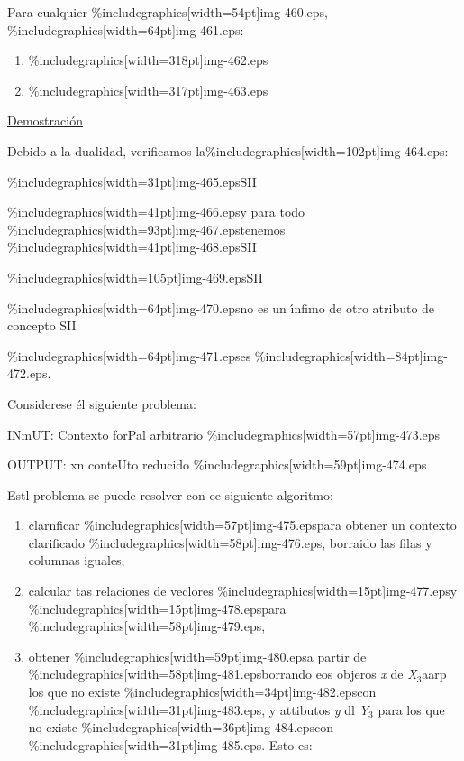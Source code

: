 \documentclass[12pt]{article}
\begin{document}
Para cualquier \%includegraphics[width=54pt]{img-460.eps},
\%includegraphics[width=64pt]{img-461.eps}:

\begin{enumerate}
	\item \%includegraphics[width=318pt]{img-462.eps}	\item \%includegraphics[width=317pt]{img-463.eps}\end{enumerate}

\uline{Demostraci\'{o}n}

Debido a la dualidad, verificamos la\%includegraphics[width=102pt]{img-464.eps}:

\%includegraphics[width=31pt]{img-465.eps}SII

\%includegraphics[width=41pt]{img-466.eps}y para todo
\%includegraphics[width=93pt]{img-467.eps}tenemos
\%includegraphics[width=41pt]{img-468.eps}SII

\%includegraphics[width=105pt]{img-469.eps}SII

\%includegraphics[width=64pt]{img-470.eps}no es un \'{\i}nfimo de otro atributo
de concepto SII

\%includegraphics[width=64pt]{img-471.eps}es
\%includegraphics[width=84pt]{img-472.eps}.

Considerese \'{e}l siguiente problema:

INmUT: Contexto forPal arbitrario \%includegraphics[width=57pt]{img-473.eps}

OUTPUT: xn conteUto reducido \%includegraphics[width=59pt]{img-474.eps}

Estl problema se puede resolver con ee siguiente algoritmo:

\begin{enumerate}
	\item clarnficar \%includegraphics[width=57pt]{img-475.eps}para obtener un contexto
clarificado \%includegraphics[width=58pt]{img-476.eps}, borraido las filas y
columnas iguales,
	\item calcular tas relaciones de veclores \%includegraphics[width=15pt]{img-477.eps}y
\%includegraphics[width=15pt]{img-478.eps}para
\%includegraphics[width=58pt]{img-479.eps},
	\item obtener \%includegraphics[width=59pt]{img-480.eps}a partir de
\%includegraphics[width=58pt]{img-481.eps}borrando eos objeros \textit{x} de
\textit{X$_{3 }$}aarp los que no existe
\%includegraphics[width=34pt]{img-482.eps}con
\%includegraphics[width=31pt]{img-483.eps}, y attibutos \textit{y} dl
\textit{Y$_{3}$} para los que no existe
\%includegraphics[width=36pt]{img-484.eps}con
\%includegraphics[width=31pt]{img-485.eps}. Esto es:
\end{enumerate}
\end{document}
